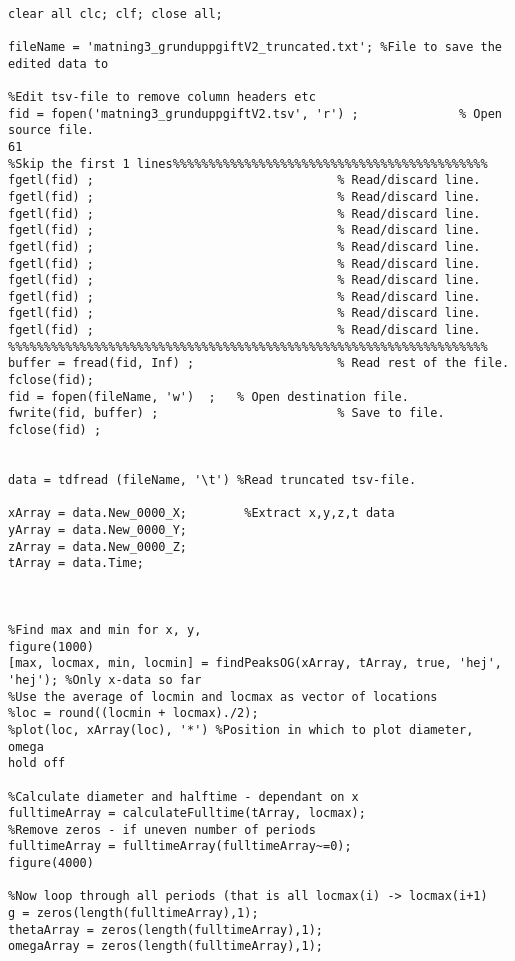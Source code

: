\begin{lstlisting}[style=Matlab-editor]

clear all clc; clf; close all;

fileName = 'matning3_grunduppgiftV2_truncated.txt'; %File to save the edited data to

%Edit tsv-file to remove column headers etc
fid = fopen('matning3_grunduppgiftV2.tsv', 'r') ;              % Open source file.
61
%Skip the first 1 lines%%%%%%%%%%%%%%%%%%%%%%%%%%%%%%%%%%%%%%%%%%%% 
fgetl(fid) ;                                  % Read/discard line.
fgetl(fid) ;                                  % Read/discard line.
fgetl(fid) ;                                  % Read/discard line.
fgetl(fid) ;                                  % Read/discard line.
fgetl(fid) ;                                  % Read/discard line.
fgetl(fid) ;                                  % Read/discard line.
fgetl(fid) ;                                  % Read/discard line.
fgetl(fid) ;                                  % Read/discard line.
fgetl(fid) ;                                  % Read/discard line.
fgetl(fid) ;                                  % Read/discard line.
%%%%%%%%%%%%%%%%%%%%%%%%%%%%%%%%%%%%%%%%%%%%%%%%%%%%%%%%%%%%%%%%%%% 
buffer = fread(fid, Inf) ;                    % Read rest of the file.
fclose(fid);
fid = fopen(fileName, 'w')  ;   % Open destination file.
fwrite(fid, buffer) ;                         % Save to file.
fclose(fid) ;


data = tdfread (fileName, '\t') %Read truncated tsv-file.

xArray = data.New_0000_X;        %Extract x,y,z,t data
yArray = data.New_0000_Y;
zArray = data.New_0000_Z;
tArray = data.Time;



%Find max and min for x, y, 
figure(1000)
[max, locmax, min, locmin] = findPeaksOG(xArray, tArray, true, 'hej', 'hej'); %Only x-data so far
%Use the average of locmin and locmax as vector of locations
%loc = round((locmin + locmax)./2);
%plot(loc, xArray(loc), '*') %Position in which to plot diameter, omega
hold off

%Calculate diameter and halftime - dependant on x
fulltimeArray = calculateFulltime(tArray, locmax);
%Remove zeros - if uneven number of periods
fulltimeArray = fulltimeArray(fulltimeArray~=0);
figure(4000)

%Now loop through all periods (that is all locmax(i) -> locmax(i+1)
g = zeros(length(fulltimeArray),1);
thetaArray = zeros(length(fulltimeArray),1);
omegaArray = zeros(length(fulltimeArray),1);


\end{lstlisting}
